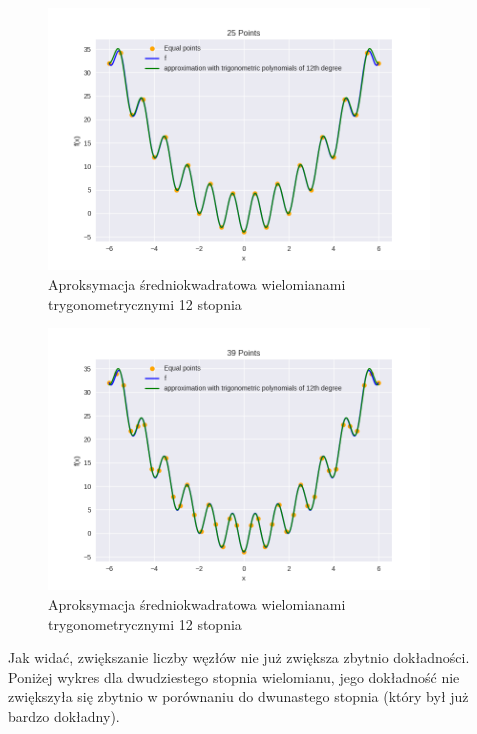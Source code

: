 \documentclass{article}
\begin{document}
\begin{figure}[H]
    \centering
    \includegraphics[width=0.9\textwidth]{img/tripoly_12_25.png}
    \caption{Aproksymacja średniokwadratowa wielomianami trygonometrycznymi 12 stopnia}
\end{figure}

\begin{figure}[H]
    \centering
    \includegraphics[width=0.9\textwidth]{img/tripoly_12_39.png}
    \caption{Aproksymacja średniokwadratowa wielomianami trygonometrycznymi 12 stopnia}
\end{figure}

Jak widać, zwiększanie liczby węzłów nie już zwiększa zbytnio dokładności. Poniżej wykres dla dwudziestego stopnia wielomianu,
jego dokładność nie zwiększyła się zbytnio w porównaniu do dwunastego stopnia (który był już bardzo dokładny).
\end{document}
